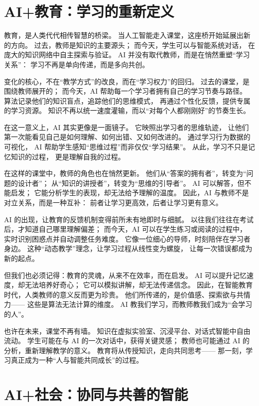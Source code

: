 \section{AI+教育：学习的重新定义}

教育，是人类代代相传智慧的桥梁。  
当人工智能走入课堂，这座桥开始延展出新的方向。  
过去，教师是知识的主要源头；  
而今天，学生可以与智能系统对话，  
在庞大的知识网络中自主探索与验证。  
AI 并没有取代教师，而是在悄然重塑“学习关系”：  
学习不再是单向传递，而是多向共创。

变化的核心，不在“教学方式”的改良，而在“学习权力”的回归。  
过去的课堂，是围绕教师展开的；  
而今天，AI 帮助每一个学习者拥有自己的学习节奏与路径。  
算法记录他们的知识盲点，追踪他们的思维模式，  
再通过个性化反馈，提供专属的学习资源。  
知识不再以统一速度灌输，而以“对每个人都刚刚好”的节奏生长。

在这一意义上，AI 其实更像是一面镜子。  
它映照出学习者的思维轨迹，  
让他们第一次能看见自己是如何理解、如何出错、又如何改进的。  
通过学习行为数据的可视化，  
AI 帮助学生感知“思维过程”而非仅仅“学习结果”。  
从此，学习不只是记忆知识的过程，  
更是理解自我的过程。

在这样的课堂中，教师的角色也在悄然更新。  
他们从“答案的拥有者”，转变为“问题的设计者”；  
从“知识的讲授者”，转变为“思维的引导者”。  
AI 可以解答，但不能启发；  
它能分析学生的表现，却无法给予理解的温度。  
因此，AI 与教师不是对立关系，而是一种互补：  
前者让学习更高效，后者让学习更有意义。

AI 的出现，让教育的反馈机制变得前所未有地即时与细腻。  
以往我们往往在考试后，才知道自己哪里理解偏差；  
而今天，AI 可以在学生练习或阅读的过程中，  
实时识别困惑点并自动调整任务难度。  
它像一位细心的导师，时刻陪伴在学习者身边。  
这种“动态教学”理念，让学习过程从线性变为螺旋，  
让每一次错误都成为新的起点。

但我们也必须记得：教育的灵魂，从来不在效率，而在启发。  
AI 可以提升记忆速度，却无法培养好奇心；  
它可以模拟讲解，却无法传递信念。  
因此，在智能教育时代，人类教师的意义反而更为珍贵。  
他们所传递的，是价值感、探索欲与共情力——  
这些是算法无法计算的维度。  
AI 教我们学习，而教师教我们成为“会学习的人”。

也许在未来，课堂不再有墙。  
知识在虚拟实验室、沉浸平台、对话式智能中自由流动。  
学生可能在与 AI 的一次对话中，获得关键灵感；  
教师也可能通过 AI 的分析，重新理解教学的意义。  
教育将从传授知识，走向共同思考——  
那一刻，学习真正成为一种“人与智能共同成长”的过程。

\section{AI+社会：协同与共善的智能}

